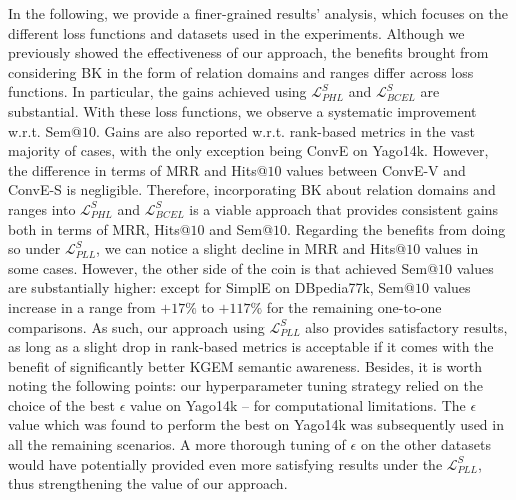 \documentclass[letterpaper]{article} %
\begin{document}
In the following, we provide a finer-grained results' analysis, which focuses on the different loss functions and datasets used in the experiments.
Although we previously showed the effectiveness of our approach, the benefits brought from considering BK in the form of relation domains and ranges differ across loss functions. In particular, the gains achieved using $\mathcal{L}^{S}_{PHL}$ and $\mathcal{L}^{S}_{BCEL}$ are substantial. With these loss functions, we observe a systematic improvement w.r.t. Sem@$10$. Gains are also reported w.r.t. rank-based metrics in the vast majority of cases, with the only exception being ConvE on Yago14k. However, the difference in terms of MRR and Hits@$10$ values between ConvE-V and ConvE-S is negligible. Therefore, incorporating BK about relation domains and ranges into $\mathcal{L}^{S}_{PHL}$ and $\mathcal{L}^{S}_{BCEL}$ is a viable approach that provides consistent gains both in terms of MRR, Hits@$10$ and Sem@$10$.
Regarding the benefits from doing so under $\mathcal{L}^{S}_{PLL}$, we can notice a slight decline in MRR and Hits@$10$ values in some cases. However, the other side of the coin is that achieved Sem@$10$ values are substantially higher: except for SimplE on DBpedia77k, Sem@$10$ values increase in a range from $+17\%$ to $+117\%$ for the remaining one-to-one comparisons. As such, our approach using $\mathcal{L}^{S}_{PLL}$ also provides satisfactory results, as long as a slight drop in rank-based metrics is acceptable if it comes with the benefit of significantly better KGEM semantic awareness. Besides, it is worth noting the following points: our hyperparameter tuning strategy relied on the choice of the best $\epsilon$ value on Yago14k -- for computational limitations. The $\epsilon$ value which was found to perform the best on Yago14k was subsequently used in all the remaining scenarios. A more thorough tuning of $\epsilon$ on the other datasets would have potentially provided even more satisfying results under the $\mathcal{L}^{S}_{PLL}$, thus strengthening the value of our approach.
\end{document}
